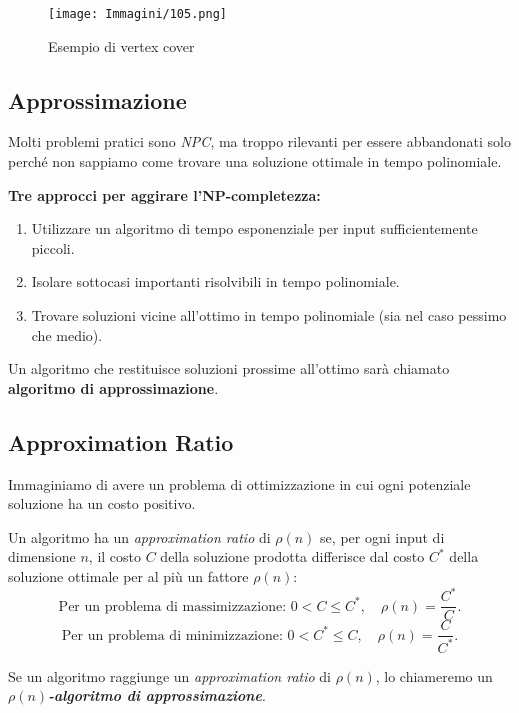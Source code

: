\documentclass{article}
\begin{document}
\begin{figure}[H]
    \centering
    \texttt{[image: Immagini/105.png]}
    \caption{Esempio di vertex cover}
    \label{fig:vertex-cover-example-2}
\end{figure}

\newpage
\subsection{Approssimazione}
Molti problemi pratici sono \textit{NPC}, ma troppo rilevanti per essere abbandonati solo perché non sappiamo come trovare una soluzione ottimale in tempo polinomiale.

\textbf{Tre approcci per aggirare l’NP-completezza:}
\begin{enumerate}
    \item Utilizzare un algoritmo di tempo esponenziale per input sufficientemente piccoli.
    \item Isolare sottocasi importanti risolvibili in tempo polinomiale.
    \item Trovare soluzioni vicine all’ottimo in tempo polinomiale (sia nel caso pessimo che medio).
\end{enumerate}

Un algoritmo che restituisce soluzioni prossime all’ottimo sarà chiamato \textbf{algoritmo di approssimazione}.

\subsection*{Approximation Ratio}
Immaginiamo di avere un problema di ottimizzazione in cui ogni potenziale soluzione ha un costo positivo.

\begin{tcolorbox}[colback=yellow!10!white, colframe=yellow!50!black, title=Definizione]
    Un algoritmo ha un \textit{approximation ratio} di $\rho(n)$ se, per ogni input di dimensione $n$, il costo $C$ della soluzione prodotta differisce dal costo $C^*$ della soluzione ottimale per al più un fattore $\rho(n)$:
    \[
    \text{Per un problema di massimizzazione: } 0 < C \leq C^*, \quad \rho(n) = \frac{C^*}{C}.
    \]
    \[
    \text{Per un problema di minimizzazione: } 0 < C^* \leq C, \quad \rho(n) = \frac{C}{C^*}.
    \]

    Se un algoritmo raggiunge un \textit{approximation ratio} di $\rho(n)$, lo chiameremo un \textbf{\textit{$\rho(n)$-algoritmo di approssimazione}}.
\end{tcolorbox}
\end{document}
